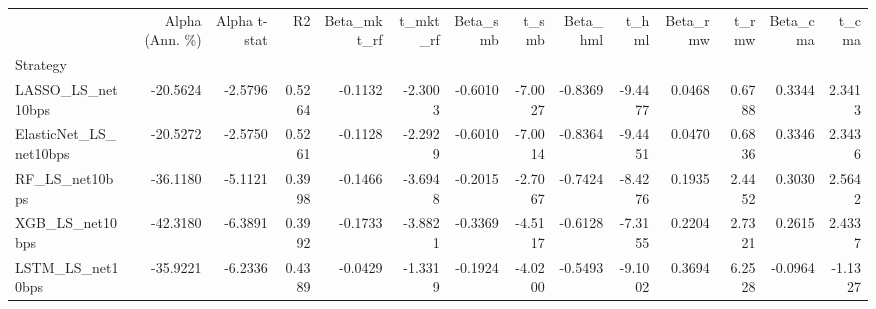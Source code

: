 \begin{tabular}{lrrrrrrrrrrrrr}
\toprule
 & Alpha (Ann. \%) & Alpha t-stat & R2 & Beta\_mkt\_rf & t\_mkt\_rf & Beta\_smb & t\_smb & Beta\_hml & t\_hml & Beta\_rmw & t\_rmw & Beta\_cma & t\_cma \\
Strategy &  &  &  &  &  &  &  &  &  &  &  &  &  \\
\midrule
LASSO\_LS\_net10bps & -20.5624 & -2.5796 & 0.5264 & -0.1132 & -2.3003 & -0.6010 & -7.0027 & -0.8369 & -9.4477 & 0.0468 & 0.6788 & 0.3344 & 2.3413 \\
ElasticNet\_LS\_net10bps & -20.5272 & -2.5750 & 0.5261 & -0.1128 & -2.2929 & -0.6010 & -7.0014 & -0.8364 & -9.4451 & 0.0470 & 0.6836 & 0.3346 & 2.3436 \\
RF\_LS\_net10bps & -36.1180 & -5.1121 & 0.3998 & -0.1466 & -3.6948 & -0.2015 & -2.7067 & -0.7424 & -8.4276 & 0.1935 & 2.4452 & 0.3030 & 2.5642 \\
XGB\_LS\_net10bps & -42.3180 & -6.3891 & 0.3992 & -0.1733 & -3.8821 & -0.3369 & -4.5117 & -0.6128 & -7.3155 & 0.2204 & 2.7321 & 0.2615 & 2.4337 \\
LSTM\_LS\_net10bps & -35.9221 & -6.2336 & 0.4389 & -0.0429 & -1.3319 & -0.1924 & -4.0200 & -0.5493 & -9.1002 & 0.3694 & 6.2528 & -0.0964 & -1.1327 \\
\bottomrule
\end{tabular}
